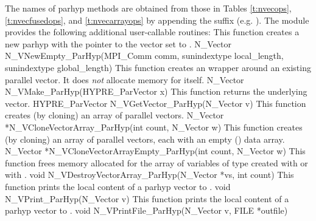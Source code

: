 The names of parhyp methods are obtained from those in Tables \ref{t:nvecops},
\ref{t:nvecfusedops}, and \ref{t:nvecarrayops}
by appending the suffix  (e.g. ).
The module {\nvecph} provides the following additional user-callable routines:
{
  This function creates a new parhyp  with the pointer to the {\hypre} 
  vector set to .
}
{
  N\_Vector N\_VNewEmpty\_ParHyp(MPI\_Comm comm, 
  sunindextype local\_length, 
  sunindextype global\_length)
}
{  
  This function creates an  wrapper around an existing
  {\hypre} parallel vector. It does {\em not} allocate memory for  
  itself.  
}
{
  N\_Vector N\_VMake\_ParHyp(HYPRE\_ParVector x)
}
{  
  This function returns the underlying {\hypre} vector.
}
{
  HYPRE\_ParVector N\_VGetVector\_ParHyp(N\_Vector v)
}
{ 
  This function creates (by cloning) an array of  parallel vectors.
}
{
  N\_Vector *N\_VCloneVectorArray\_ParHyp(int count, N\_Vector w)
}
{
  This function creates (by cloning) an array of  parallel vectors,
  each with an empty () data array.
}
{
  N\_Vector *N\_VCloneVectorArrayEmpty\_ParHyp(int count, N\_Vector w)
}
{ 
  This function frees memory allocated for the array of   variables of
  type  created with  or with
  .
}
{
  void N\_VDestroyVectorArray\_ParHyp(N\_Vector *vs, int count)
}
{  
  This function prints the local content of a parhyp vector to .
}
{   
  void N\_VPrint\_ParHyp(N\_Vector v)
}
{  
  This function prints the local content of a parhyp vector to .
}
{   
  void N\_VPrintFile\_ParHyp(N\_Vector v, FILE *outfile)
}


